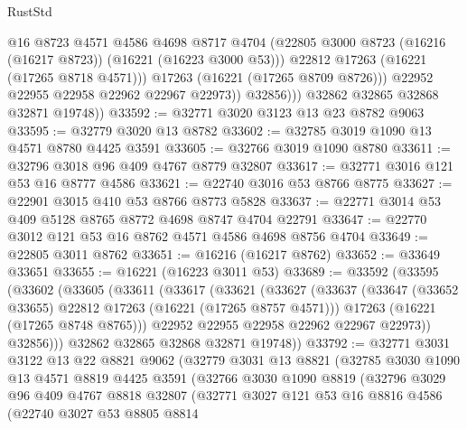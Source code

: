 \begin{lexlean}{RustStd}
\begin{coremodule}
                      @16
                      @8723
                      @4571
                      @4586
                      @4698
                      @8717
                      @4704
                      (@22805 @3000 @8723 (@16216 (@16217 @8723)) (@16221 (@16223 @3000 @53)))
                      @22812
                      @17263
                      (@16221 (@17265 @8718 @4571)))
                    @17263
                    (@16221 (@17265 @8709 @8726)))
                  @22952
                  @22955
                  @22958
                  @22962
                  @22967
                  @22973))
              @32856)))
        @32862
        @32865
        @32868
        @32871
        @19748))
@33592 := @32771 @3020 @3123 @13 @23 @8782 @9063
@33595 := @32779 @3020 @13 @8782
@33602 := @32785 @3019 @1090 @13 @4571 @8780 @4425 @3591
@33605 := @32766 @3019 @1090 @8780
@33611 := @32796 @3018 @96 @409 @4767 @8779 @32807
@33617 := @32771 @3016 @121 @53 @16 @8777 @4586
@33621 := @22740 @3016 @53 @8766 @8775
@33627 := @22901 @3015 @410 @53 @8766 @8773 @5828
@33637 := @22771 @3014 @53 @409 @5128 @8765 @8772 @4698 @8747 @4704 @22791
@33647 := @22770 @3012 @121 @53 @16 @8762 @4571 @4586 @4698 @8756 @4704
@33649 := @22805 @3011 @8762
@33651 := @16216 (@16217 @8762)
@33652 := @33649 @33651
@33655 := @16221 (@16223 @3011 @53)
@33689 := @33592
    (@33595
      (@33602
        (@33605
          (@33611
            (@33617
              (@33621
                (@33627
                  (@33637
                    (@33647 (@33652 @33655) @22812 @17263 (@16221 (@17265 @8757 @4571)))
                    @17263
                    (@16221 (@17265 @8748 @8765)))
                  @22952
                  @22955
                  @22958
                  @22962
                  @22967
                  @22973))
              @32856)))
        @32862
        @32865
        @32868
        @32871
        @19748))
@33792 := @32771
    @3031
    @3122
    @13
    @22
    @8821
    @9062
    (@32779
      @3031
      @13
      @8821
      (@32785
        @3030
        @1090
        @13
        @4571
        @8819
        @4425
        @3591
        (@32766
          @3030
          @1090
          @8819
          (@32796
            @3029
            @96
            @409
            @4767
            @8818
            @32807
            (@32771
              @3027
              @121
              @53
              @16
              @8816
              @4586
              (@22740
                @3027
                @53
                @8805
                @8814

\end{coremodule}
\end{lexlean}
